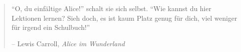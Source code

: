 
\newpage \vspace*{8cm}
\thispagestyle{empty}
\begin{quotation}
\begin{center}
  \large
  \enquote{O, du einfältige Alice!} schalt sie sich selbst. \enquote{Wie kannst
  du hier Lektionen lernen? Sieh doch, es ist kaum Platz genug für dich, viel
  weniger für irgend ein Schulbuch!}
\end{center}
\begin{flushright} -- Lewis Carroll, \textit{Alice im Wunderland}\end{flushright}
\end{quotation}
